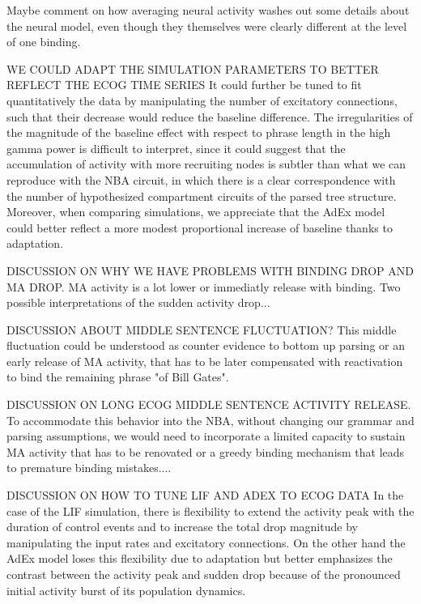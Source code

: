 \documentclass[10pt]{article}
\begin{document}
Maybe comment on how averaging neural activity washes out some details about the neural model, even though they themselves were clearly different at the level of one binding.



WE COULD ADAPT THE SIMULATION PARAMETERS TO BETTER REFLECT THE ECOG TIME SERIES
It could further be tuned to fit quantitatively the data by manipulating the number of excitatory connections, such that their decrease would reduce the baseline difference.
The irregularities of the magnitude of the baseline effect with respect to phrase length in the high gamma power is difficult to interpret, since it could suggest that the accumulation of activity with more recruiting nodes is subtler than what we can reproduce with the NBA circuit, in which there is a clear correspondence with the number of hypothesized compartment circuits of the parsed tree structure.
Moreover, when comparing simulations, we appreciate that the AdEx model could better reflect a more modest proportional increase of baseline thanks to adaptation.~




DISCUSSION ON WHY WE HAVE PROBLEMS WITH BINDING DROP AND MA DROP. MA activity is a lot lower or immediatly release with binding. Two possible interpretations of the sudden activity drop...

DISCUSSION ABOUT MIDDLE SENTENCE FLUCTUATION? This middle fluctuation could be understood as counter evidence to bottom up parsing or an early release of MA activity, that has to be later compensated with reactivation to bind the remaining phrase "of Bill Gates".

DISCUSSION ON LONG ECOG MIDDLE SENTENCE ACTIVITY RELEASE. To accommodate this behavior into the NBA, without changing our grammar and parsing assumptions, we would need to incorporate a limited capacity to sustain MA activity that has to be renovated or a greedy binding mechanism that leads to premature binding mistakes....

DISCUSSION ON HOW TO TUNE LIF AND ADEX TO ECOG DATA
In the case of the LIF simulation, there is flexibility to extend the activity peak with the duration of control events and to increase the total drop magnitude by manipulating the input rates and excitatory connections.
On the other hand the AdEx model loses this flexibility due to adaptation but better emphasizes the contrast between the activity peak and sudden drop because of the pronounced initial activity burst of its population dynamics.
\end{document}
